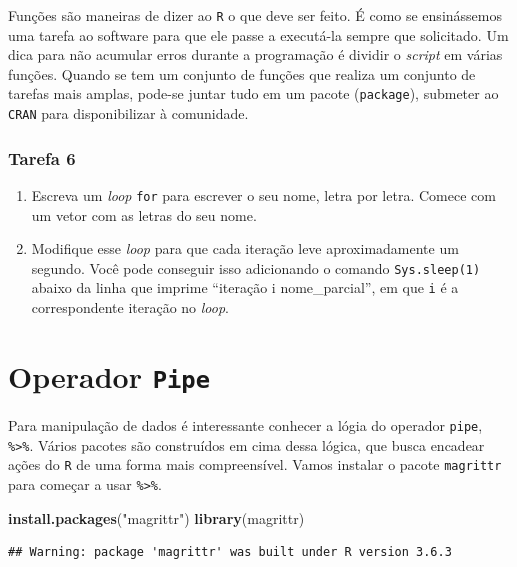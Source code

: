 \documentclass[
]{book}
\newenvironment{Shaded}{\begin{snugshade}}{\end{snugshade}}
\newcommand{\KeywordTok}[1]{\textcolor[rgb]{0.13,0.29,0.53}{\textbf{#1}}}
\newcommand{\NormalTok}[1]{#1}
\newcommand{\StringTok}[1]{\textcolor[rgb]{0.31,0.60,0.02}{#1}}
\providecommand{\tightlist}{%
  \setlength{\itemsep}{0pt}\setlength{\parskip}{0pt}}
\theoremstyle{definition}
\theoremstyle{definition}
\theoremstyle{definition}
\theoremstyle{remark}
\begin{document}
Funções são maneiras de dizer ao \texttt{R} o que deve ser feito. É como se ensinássemos uma tarefa ao software para que ele passe a executá-la sempre que solicitado. Um dica para não acumular erros durante a programação é dividir o \emph{script} em várias funções. Quando se tem um conjunto de funções que realiza um conjunto de tarefas mais amplas, pode-se juntar tudo em um pacote (\texttt{package}), submeter ao \texttt{CRAN} para disponibilizar à comunidade.

\hypertarget{tarefa-6}{%
\subsubsection*{Tarefa 6}\label{tarefa-6}}

\begin{enumerate}
\def\labelenumi{\arabic{enumi}.}
\tightlist
\item
  Escreva um \emph{loop} \texttt{for} para escrever o seu nome, letra por letra. Comece com um vetor com as letras do seu nome.
\item
  Modifique esse \emph{loop} para que cada iteração leve aproximadamente um segundo. Você pode conseguir isso adicionando o comando \texttt{Sys.sleep(1)} abaixo da linha que imprime ``iteração i nome\_parcial'', em que \texttt{i} é a correspondente iteração no \emph{loop}.
\end{enumerate}

\hypertarget{operador-pipe}{%
\section{\texorpdfstring{Operador \texttt{Pipe}}{Operador Pipe}}\label{operador-pipe}}

Para manipulação de dados é interessante conhecer a lógia do operador \texttt{pipe}, \texttt{\%\textgreater{}\%}. Vários pacotes são construídos em cima dessa lógica, que busca encadear ações do \texttt{R} de uma forma mais compreensível. Vamos instalar o pacote \texttt{magrittr} para começar a usar \texttt{\%\textgreater{}\%}.

\begin{Shaded}
\begin{Highlighting}[]
\KeywordTok{install.packages}\NormalTok{(}\StringTok{"magrittr"}\NormalTok{)}
\KeywordTok{library}\NormalTok{(magrittr)}
\end{Highlighting}
\end{Shaded}

\begin{verbatim}
## Warning: package 'magrittr' was built under R version 3.6.3
\end{verbatim}
\end{document}
